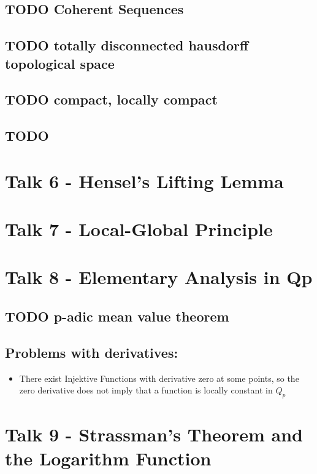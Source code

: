 \documentclass[11pt]{article}
\begin{document}
\subsection{{\bfseries\sffamily TODO} Coherent Sequences}
\label{sec:orgddc089b}
\subsection{{\bfseries\sffamily TODO} totally disconnected hausdorff topological space}
\label{sec:org53fc51e}
\subsection{{\bfseries\sffamily TODO} compact, locally compact}
\label{sec:org3152873}
\subsection{TODO}
\label{sec:org4ec36da}
\section{Talk 6 - Hensel's Lifting Lemma}
\label{sec:org7e1f65e}
\section{Talk 7 - Local-Global Principle}
\label{sec:org38b7a15}
\section{Talk 8 - Elementary Analysis in Qp}
\label{sec:org3f3b24b}
\subsection{{\bfseries\sffamily TODO} p-adic mean value theorem}
\label{sec:org99a2571}
\subsection{Problems with derivatives:}
\label{sec:orgc3bcde7}
\begin{itemize}
\item There exist Injektive Functions with derivative zero at some points, so the zero derivative does not imply that a function is locally constant in \(Q_p\)
\end{itemize}

\section{Talk 9 - Strassman's Theorem and the Logarithm Function}
\label{sec:org5af5d7f}
\end{document}

